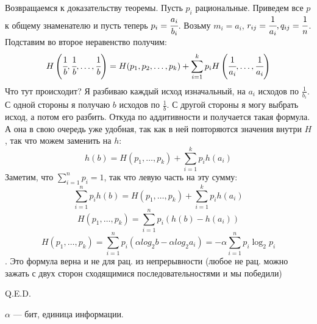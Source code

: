 Возвращаемся к доказательству теоремы. Пусть $p_i$ рациональные. Приведем все $p$ к общему знаменателю и пусть теперь $p_i  = \cfrac{a_i}{b_i}$. Возьму $m_i = a_i$, $r_{ij}=\cfrac{1}{a_i}, q_{ij} = \cfrac{1}{n}$. Подставим во второе неравенство получим:
$$H\left(\cfrac{1}{b},\cfrac{1}{b},\ldots, \cfrac{1}{b}\right)= H(p_1,p_2,\ldots,p_k) + \sum\limits_{i=1}^kp_i H\left(\cfrac{1}{a_i},\ldots,\cfrac{1}{a_i}\right)$$
Что тут происходит? Я разбиваю каждый исход изначальный, на $a_i$ исходов по $\frac{1}{b_i}$. С одной стороны я получаю $b$ исходов по $\frac{1}{b}$. С другой стороны я могу выбрать исход, а потом его разбить. Откуда по аддитивности и получается такая формула. А она в свою очередь уже удобная, так как в ней повторяются значения внутри $H$, так что можем заменить на $h$:
$$h(b) = H(p_1,\ldots,p_k)+\sum\limits_{i=1}^kp_ih(a_i)$$
Заметим, что $\sum\limits_{i=1}^np_i=1$, так что левую часть на эту сумму:
$$\sum\limits_{i=1}^np_ih(b) = H(p_1,\ldots,p_k)+\sum\limits_{i=1}^kp_ih(a_i)$$
$$H(p_1,\ldots,p_k)=\sum\limits_{i=1}^np_i(h(b)-h(a_i))$$
$$H(p_1,\ldots,p_k)=\sum\limits_{i=1}^np_i(\alpha log_2b-\alpha log_2a_i) = -\alpha\sum\limits_{i=1}^np_i\log_2 p_i$$.
Это формула верна и не для рац. из непрерывности (любое не рац. можно зажать с двух сторон сходящимися последовательностями и мы победили)

\hfill Q.E.D.

$\alpha$ --- бит, единица информации.

